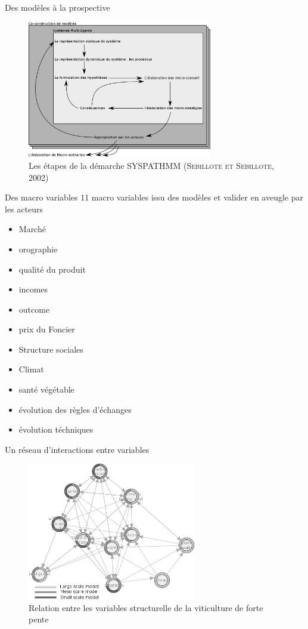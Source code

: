 \documentclass[newPxFont]{beamer}
\begin{document}
\begin{frame}[c]{Des modèles à la prospective}
  \vspace{-2em}
  \begin{figure}
   \includegraphics[height=6cm]{img/a_etapes_syspathmm.png}
   \caption{Les étapes de la démarche SYSPATHMM (\textsc{Sebillote et Sebillote,  2002})}
  \end{figure}
\end{frame}

\begin{frame}[c]{Des macro variables}
  \vspace{-2em}
  11 macro variables issu des modèles et valider en aveugle par les acteurs
  \begin{itemize}
    \item Marché
    \item orographie
    \item qualité du produit
    \item incomes
    \item outcome
    \item prix du Foncier
    \item Structure sociales
    \item Climat
    \item santé végétable
    \item évolution des règles d'échanges
    \item évolution téchniques
  \end{itemize}
\end{frame}

\begin{frame}[c]{Un réseau d'interactions entre variables}
  \vspace{-2em}
  \begin{figure}
   \includegraphics[height=6cm]{img/a_igraph_variables_structurelle.png}
   \caption{Relation entre les variables structurelle de la viticulture de forte pente}
  \end{figure}
\end{frame}
\end{document}
